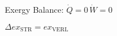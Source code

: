 Exergy Balance:  
\( \dot{Q} = 0 \, \dot{W} = 0 \)  

\( \Delta ex_{\text{STR}} = ex_{\text{VERL}} \)